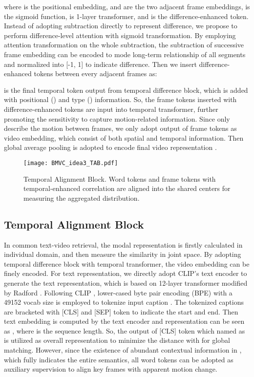 \documentclass[final]{cvpr}
\begin{document}
where  is the positional embedding,  and  are the two adjacent frame embeddings,  is the sigmoid function,  is 1-layer transformer, and  is the difference-enhanced token. Instead of  adopting  subtraction directly to represent difference, we propose to perform difference-level attention   with sigmoid transformation. By employing attention transformation on the whole subtraction, the subtraction of successive frame embedding can be encoded to mode long-term relationship of all segments and normalized into [-1, 1] to indicate difference. Then we insert difference-enhanced tokens between every adjacent frames as:

 is the final temporal token output from temporal difference block, which is added with positional () and type () information. So, the frame tokens inserted with difference-enhanced tokens are input into temporal transformer, further promoting the sensitivity to capture motion-related information. Since  only describe the motion between frames, we only adopt output of frame tokens  as video embedding, which consist of both spatial and temporal information. Then global average pooling is adopted to encode final video representation .


\begin{figure}
        \begin{center}
            \texttt{[image: BMVC\_idea3\_TAB.pdf]}
        \end{center}
        \vspace{-0.2cm}
        \caption{Temporal Alignment Block. Word tokens and frame tokens with temporal-enhanced correlation are aligned into the shared centers   for measuring the aggregated distribution.}
        \label{TAB}  
\end{figure}

\subsection{Temporal Alignment Block}
In common text-video retrieval, the modal representation is firstly calculated in individual domain, and then measure the similarity in joint space. By adopting temporal difference block with temporal transformer, the video embedding can be finely encoded. For text representation, 
we directly adopt CLIP's text encoder to generate the text representation, which is based on 12-layer transformer \cite{vaswani2017attention} modified by Radford \etal \cite{radford2019language}. Following CLIP \cite{radford2021learning}, lower-cased byte pair encoding (BPE) with a 49152 vocab size \cite{sennrich2015neural} is employed to tokenize input caption . The tokenized captions are bracketed with [CLS] and [SEP] token to indicate the start and end. Then text embedding is computed by the text encoder and representation can be seen as , where  is the sequence length. So, the output of [CLS] token which named as  is utilized as overall representation  to minimize the distance with  for global matching. However, since the existence of abundant contextual information in , which fully indicates the entire semantics, all word tokens can be adopted as auxiliary supervision to align key frames with apparent motion change. 
\end{document}
